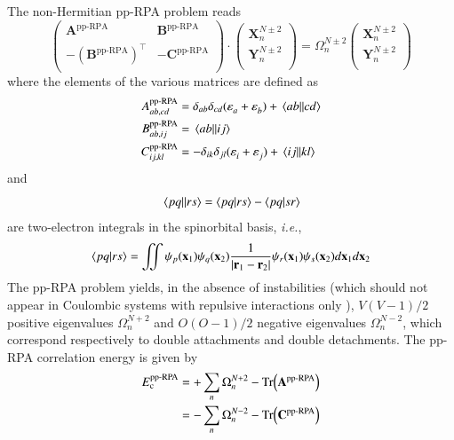 \documentclass[aip,jcp,reprint,noshowkeys,superscriptaddress]{revtex4-1}
\newcommand{\ie}{\textit{i.e.}}
\newcommand{\T}[1]{#1^{\intercal}}
\newcommand{\br}{\mathbf{r}}
\newcommand{\bx}{\mathbf{x}}
\newcommand{\Nocc}{O}
\newcommand{\Nvir}{V}
\newcommand{\ppRPA}{\text{pp-RPA}}
\newcommand{\Ec}{E_\text{c}}
\newcommand{\e}[2]{\eps_{#1}^{#2}}
\newcommand{\Om}[2]{\Omega_{#1}^{#2}}
\newcommand{\SO}[1]{\psi_{#1}}
\newcommand{\bA}[2]{\mathbf{A}_{#1}^{#2}}
\newcommand{\bB}[2]{\mathbf{B}_{#1}^{#2}}
\newcommand{\bC}[2]{\mathbf{C}_{#1}^{#2}}
\newcommand{\bX}[2]{\mathbf{X}_{#1}^{#2}}
\newcommand{\bY}[2]{\mathbf{Y}_{#1}^{#2}}
\newcommand{\eps}{\varepsilon}
\begin{document}
The non-Hermitian pp-RPA problem reads \cite{Schuck_Book,vanAggelen_2013,Peng_2013,Scuseria_2013,Yang_2013,Yang_2013b,vanAggelen_2014,Yang_2014a,Zhang_2015,Zhang_2016,Bannwarth_2020}
\begin{equation}
\label{eq:LR-RPA}
	\begin{pmatrix}
		\bA{}{\ppRPA}			&	\bB{}{\ppRPA}	\\
		-\T{(\bB{}{\ppRPA})}	&	-\bC{}{\ppRPA}	\\
	\end{pmatrix}
	\cdot
	\begin{pmatrix}
		\bX{n}{N\pm2}	\\
		\bY{n}{N\pm2}	\\
	\end{pmatrix}
	=
	\Om{n}{N\pm2}
	\begin{pmatrix}
		\bX{n}{N\pm2}	\\
		\bY{n}{N\pm2}	\\
	\end{pmatrix}
\end{equation}
where the elements of the various matrices are defined as
\begin{subequations}
\begin{align}
	A_{ab,cd}^{\ppRPA} & = \delta_{ab} \delta_{cd} (\e{a}{} + \e{b}{}) + \mel{ab}{}{cd}
	\\ 
	B_{ab,ij}^{\ppRPA} & = \mel{ab}{}{ij}
	\\ 
	C_{ij,kl}^{\ppRPA} & = - \delta_{ik} \delta_{jl} (\e{i}{} + \e{j}{}) +\mel{ij}{}{kl}
\end{align}
\end{subequations}
and 
\begin{equation}
	\mel{pq}{}{rs} = \braket{pq}{rs} - \braket{pq}{sr}
\end{equation}
are two-electron integrals in the spinorbital basis, \ie,
\begin{equation}
	\braket{pq}{rs} = \iint \SO{p}(\bx_1) \SO{q}(\bx_2) \frac{1}{\abs{\br_1 - \br_2}} \SO{r}(\bx_1) \SO{s}(\bx_2)  d\bx_1 d\bx_2
\end{equation}
The pp-RPA problem yields, in the absence of instabilities (which should not appear in Coulombic systems with repulsive interactions only \cite{Scuseria_2013}), $\Nvir(\Nvir-1)/2$ positive eigenvalues $\Om{n}{N+2}$ and $\Nocc(\Nocc-1)/2$ negative eigenvalues $\Om{n}{N-2}$, which  correspond respectively to double attachments and double detachments.
The pp-RPA correlation energy is given by \cite{Peng_2013,Scuseria_2013}
\begin{equation}
\begin{split}
	\Ec^\ppRPA 
	& = + \sum_n \Om{n}{N+2} - \Tr(\bA{}{\ppRPA}) 
	\\
	& = - \sum_n \Om{n}{N-2} - \Tr(\bC{}{\ppRPA})
\end{split}
\end{equation}
\end{document}
